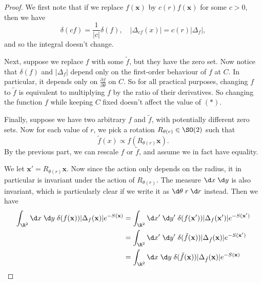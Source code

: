 \documentclass[a4paper]{article}
\begin{document}
\begin{proof}
  We first note that if we replace $f(\mathbf{x})$ by $c(r) f(\mathbf{x})$ for some $c > 0$, then we have
  \[
    \delta(cf) = \frac{1}{|c|} \delta(f),\quad |\Delta_{cf}(x)| = c(r) |\Delta_f|,
  \]
  and so the integral doesn't change.

  Next, suppose we replace $f$ with some $\tilde{f}$, but they have the zero set. Now notice that $\delta(f)$ and $|\Delta_f|$ depend only on the first-order behaviour of $f$ at $C$. In particular, it depends only on $\frac{\partial f}{\partial \theta}$ on $C$. So for all practical purposes, changing $f$ to $\tilde{f}$ is equivalent to multiplying $f$ by the ratio of their derivatives. So changing the function $f$ while keeping $C$ fixed doesn't affect the value of $(*)$.

  Finally, suppose we have two arbitrary $f$ and $\tilde{f}$, with potentially different zero sets. Now for each value of $r$, we pick a rotation $R_{\theta(r)} \in \SO(2)$ such that
  \[
    \tilde{f}(x) \propto f(R_{\theta(r)} \mathbf{x}).
  \]
  By the previous part, we can rescale $f$ or $\tilde{f}$, and assume we in fact have equality.

  We let $\mathbf{x}' = R_{\theta(r)}\mathbf{x}$. Now since the action only depends on the radius, it in particular is invariant under the action of $R_{\theta(r)}$. The measure $\d x\;\d y$ is also invariant, which is particularly clear if we write it as $\d \theta\; r\;\d r$ instead. Then we have
  \begin{align*}
    \int_{\R^2}\d x\; \d y\; \delta(f(\mathbf{x})) |\Delta_f(\mathbf{x})| e^{-S(\mathbf{x})} &= \int_{\R^2}\d x'\; \d y'\; \delta(f(\mathbf{x}')) |\Delta_f(\mathbf{x}')| e^{-S(\mathbf{x}')}\\
    &= \int_{\R^2}\d x'\; \d y'\; \delta(\tilde{f}(\mathbf{x})) |\Delta_{\tilde{f}}(\mathbf{x})| e^{-S(\mathbf{x}')}\\
    &= \int_{\R^2}\d x\; \d y\; \delta(\tilde{f}(\mathbf{x})) |\Delta_{\tilde{f}}(\mathbf{x})| e^{-S(\mathbf{x})}
  \end{align*}
\end{proof}
\end{document}

